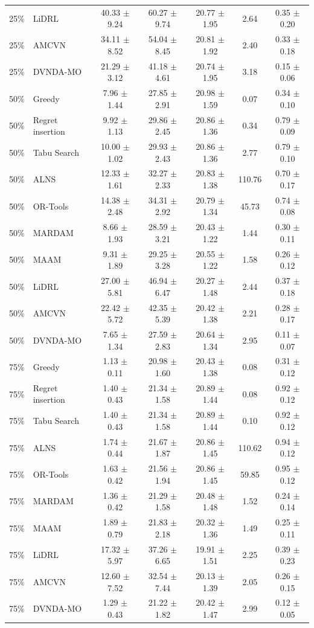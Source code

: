 \begin{tabular}{clccccc}
25\% & LiDRL & 40.33 $\pm$ 9.24 & 60.27 $\pm$ 9.74 & 20.77 $\pm$ 1.95 & 2.64 & 0.35 $\pm$ 0.20 \\
25\% & AMCVN & 34.11 $\pm$ 8.52 & 54.04 $\pm$ 8.45 & 20.81 $\pm$ 1.92 & 2.40 & 0.33 $\pm$ 0.18 \\
25\% & DVNDA-MO & 21.29 $\pm$ 3.12 & 41.18 $\pm$ 4.61 & 20.74 $\pm$ 1.95 & 3.18 & 0.15 $\pm$ 0.06 \\
50\% & Greedy & 7.96 $\pm$ 1.44 & 27.85 $\pm$ 2.91 & 20.98 $\pm$ 1.59 & 0.07 & 0.34 $\pm$ 0.10 \\
50\% & Regret insertion & 9.92 $\pm$ 1.13 & 29.86 $\pm$ 2.45 & 20.86 $\pm$ 1.36 & 0.34 & 0.79 $\pm$ 0.09 \\
50\% & Tabu Search & 10.00 $\pm$ 1.02 & 29.93 $\pm$ 2.43 & 20.86 $\pm$ 1.36 & 2.77 & 0.79 $\pm$ 0.10 \\
50\% & ALNS & 12.33 $\pm$ 1.61 & 32.27 $\pm$ 2.33 & 20.83 $\pm$ 1.38 & 110.76 & 0.70 $\pm$ 0.17 \\
50\% & OR-Tools & 14.38 $\pm$ 2.48 & 34.31 $\pm$ 2.92 & 20.79 $\pm$ 1.34 & 45.73 & 0.74 $\pm$ 0.08 \\
50\% & MARDAM & 8.66 $\pm$ 1.93 & 28.59 $\pm$ 3.21 & 20.43 $\pm$ 1.22 & 1.44 & 0.30 $\pm$ 0.11 \\
50\% & MAAM & 9.31 $\pm$ 1.89 & 29.25 $\pm$ 3.28 & 20.55 $\pm$ 1.22 & 1.58 & 0.26 $\pm$ 0.12 \\
50\% & LiDRL & 27.00 $\pm$ 5.81 & 46.94 $\pm$ 6.47 & 20.27 $\pm$ 1.48 & 2.44 & 0.37 $\pm$ 0.18 \\
50\% & AMCVN & 22.42 $\pm$ 5.72 & 42.35 $\pm$ 5.39 & 20.42 $\pm$ 1.38 & 2.21 & 0.28 $\pm$ 0.17 \\
50\% & DVNDA-MO & 7.65 $\pm$ 1.34 & 27.59 $\pm$ 2.83 & 20.64 $\pm$ 1.34 & 2.95 & 0.11 $\pm$ 0.07 \\
75\% & Greedy & 1.13 $\pm$ 0.11 & 20.98 $\pm$ 1.60 & 20.43 $\pm$ 1.38 & 0.08 & 0.31 $\pm$ 0.12 \\
75\% & Regret insertion & 1.40 $\pm$ 0.43 & 21.34 $\pm$ 1.58 & 20.89 $\pm$ 1.44 & 0.08 & 0.92 $\pm$ 0.12 \\
75\% & Tabu Search & 1.40 $\pm$ 0.43 & 21.34 $\pm$ 1.58 & 20.89 $\pm$ 1.44 & 0.10 & 0.92 $\pm$ 0.12 \\
75\% & ALNS & 1.74 $\pm$ 0.44 & 21.67 $\pm$ 1.87 & 20.86 $\pm$ 1.45 & 110.62 & 0.94 $\pm$ 0.12 \\
75\% & OR-Tools & 1.63 $\pm$ 0.42 & 21.56 $\pm$ 1.94 & 20.86 $\pm$ 1.45 & 59.85 & 0.95 $\pm$ 0.12 \\
75\% & MARDAM & 1.36 $\pm$ 0.42 & 21.29 $\pm$ 1.58 & 20.48 $\pm$ 1.48 & 1.52 & 0.24 $\pm$ 0.14 \\
75\% & MAAM & 1.89 $\pm$ 0.79 & 21.83 $\pm$ 2.18 & 20.32 $\pm$ 1.36 & 1.49 & 0.25 $\pm$ 0.11 \\
75\% & LiDRL & 17.32 $\pm$ 5.97 & 37.26 $\pm$ 6.65 & 19.91 $\pm$ 1.51 & 2.25 & 0.39 $\pm$ 0.23 \\
75\% & AMCVN & 12.60 $\pm$ 7.52 & 32.54 $\pm$ 7.44 & 20.13 $\pm$ 1.39 & 2.05 & 0.26 $\pm$ 0.15 \\
75\% & DVNDA-MO & 1.29 $\pm$ 0.43 & 21.22 $\pm$ 1.82 & 20.42 $\pm$ 1.47 & 2.99 & 0.12 $\pm$ 0.05 \\
\bottomrule
\end{tabular}
